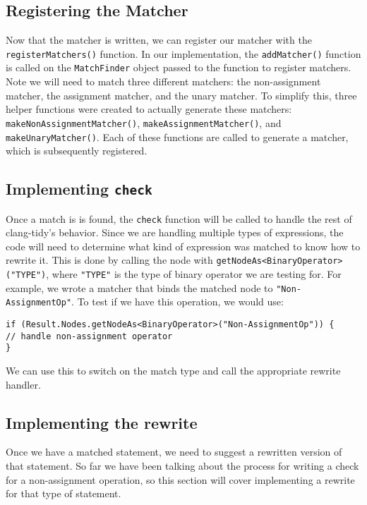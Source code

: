 \subsection{Registering the Matcher}

Now that the matcher is written, we can register our matcher with the \texttt{registerMatchers()} function. In our implementation, the \texttt{addMatcher()} function is called on the \texttt{MatchFinder} object passed to the function to register matchers. Note we will need to match three different matchers: the non-assignment matcher, the assignment matcher, and the unary matcher. To simplify this, three helper functions were created to actually generate these matchers: \texttt{makeNonAssignmentMatcher()}, \texttt{makeAssignmentMatcher()}, and \texttt{makeUnaryMatcher()}. Each of these functions are called to generate a matcher, which is subsequently registered.

\subsection{Implementing \texttt{check}}
Once a match is is found, the \texttt{check} function will be called to handle the rest of clang-tidy's behavior. Since we are handling multiple types of expressions, the code will need to determine what kind of expression was matched to know how to rewrite it. This is done by calling the node with \texttt{getNodeAs<BinaryOperator>("TYPE")}, where \texttt{"TYPE"} is the type of binary operator we are testing for. For example, we wrote a matcher that binds the matched node to \texttt{"Non-AssignmentOp"}. To test if we have this operation, we would use:
\begin{center}
\parbox{0.9\linewidth}{
\texttt{if (Result.Nodes.getNodeAs<BinaryOperator>("Non-AssignmentOp")) \{\\
\hspace*{2em}// handle non-assignment operator\\
\}}
}
\end{center}

We can use this to switch on the match type and call the appropriate rewrite handler.

\subsection{Implementing the rewrite}

Once we have a matched statement, we need to suggest a rewritten version of that statement. So far we have been talking about the process for writing a check for a non-assignment operation, so this section will cover implementing a rewrite for that type of statement.

